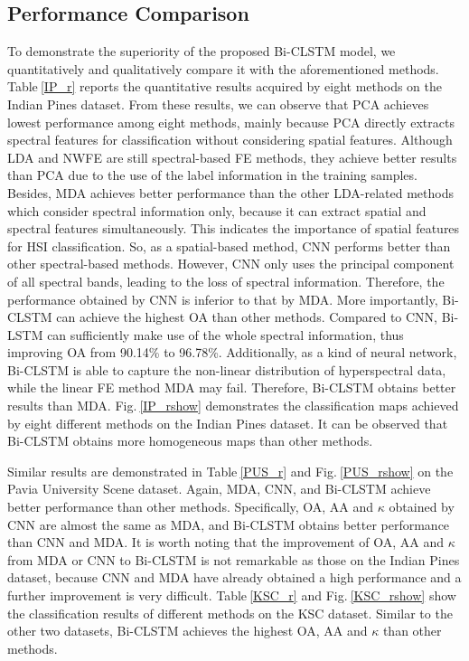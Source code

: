 \documentclass[12pt,onecolumn]{IEEEtran}
\begin{document}
\begin{spacing}{2}
\subsection{Performance Comparison}

To demonstrate the superiority of the proposed Bi-CLSTM model, we quantitatively and qualitatively compare it with the aforementioned methods. Table$~$\ref{IP_r} reports the quantitative results acquired by eight methods on the Indian Pines dataset. From these results, we can observe that PCA achieves lowest performance among eight methods, mainly because PCA directly extracts spectral features for classification without considering spatial features. Although LDA and NWFE are still spectral-based FE methods, they achieve better results than PCA due to the use of the label information in the training samples.  Besides, MDA achieves better performance than the other LDA-related methods which consider spectral information only, because it can extract spatial and spectral features simultaneously. This indicates the importance of spatial features for HSI classification. So, as a spatial-based method, CNN performs better than other spectral-based methods. However, CNN only uses the principal component of all spectral bands, leading to the loss of spectral information. Therefore, the performance obtained by CNN is inferior to that by MDA. More importantly, Bi-CLSTM can achieve the highest OA than other methods. Compared to CNN, Bi-LSTM can sufficiently make use of the whole spectral information, thus improving OA from 90.14\% to 96.78\%. Additionally, as a kind of neural network, Bi-CLSTM is able to capture the non-linear distribution of hyperspectral data, while the linear FE method MDA may fail. Therefore, Bi-CLSTM obtains better results than MDA. Fig.$~$\ref{IP_rshow} demonstrates the classification maps achieved by eight different methods on the Indian Pines dataset. It can be observed that Bi-CLSTM obtains more homogeneous maps than other methods.

Similar results are demonstrated in Table$~$\ref{PUS_r} and Fig.$~$\ref{PUS_rshow} on the Pavia University Scene dataset. Again, MDA, CNN, and Bi-CLSTM achieve better performance than other methods. Specifically, OA, AA and $\kappa$ obtained by CNN are almost the same as MDA, and Bi-CLSTM obtains better performance than CNN and MDA. It is worth noting that the improvement of OA, AA and $\kappa$ from MDA or CNN to Bi-CLSTM is not remarkable as those on the Indian Pines dataset, because CNN and MDA have already obtained a high performance and a further improvement is very difficult. Table$~$\ref{KSC_r} and Fig.$~$\ref{KSC_rshow} show the classification results of different methods on the KSC dataset. Similar to the other two datasets, Bi-CLSTM achieves the highest OA, AA and $\kappa$ than other methods.


\end{spacing}
\end{document}
